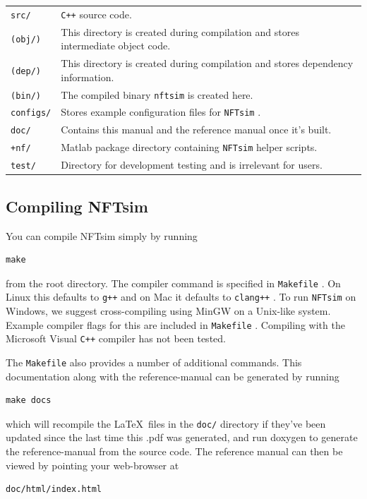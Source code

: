\documentclass[12pt,a4paper]{article}
\newcommand{\type}[1]{{\small\small\tt #1} }
\newcommand{\NF}[0]{\type{NFTsim}}
\begin{document}
\begin{tabular}{l p{13cm}}
\type{src/}& \type{C++} source code.\\
\type{(obj/)}& This directory is created during compilation and stores intermediate object code.\\
\type{(dep/)}& This directory is created during compilation and stores dependency information.\\
\type{(bin/)}& The compiled binary \type{nftsim} is created here.\\
\type{configs/}& Stores example configuration files for \NF.\\
\type{doc/}& Contains this manual and the reference manual once it's built.\\
\type{+nf/}& Matlab package directory containing \NF helper scripts.\\
\type{test/}& Directory for development testing and is irrelevant for users.\\
\end{tabular}

\subsection{Compiling NFTsim}
\label{sec:compiling}
You can compile NFTsim simply by running

\begin{lstlisting}
make
\end{lstlisting}

from the root directory. The compiler command is specified in \type{Makefile}. On Linux this defaults to \type{g++} and on Mac it defaults to \type{clang++}. To run \NF on Windows, we suggest cross-compiling using MinGW on a Unix-like system. Example compiler flags for this are included in \type{Makefile}. Compiling with the Microsoft Visual \type{C++} compiler has not been tested.

The \type{Makefile} also provides a number of additional commands. This documentation along with the reference-manual can be generated by running
\begin{lstlisting}
make docs
\end{lstlisting}
which will recompile the \LaTeX\ files in the \type{doc/} directory if they've been updated since the last time this .pdf was generated, and run doxygen to generate the reference-manual from the source code. The reference manual can then be viewed by pointing your web-browser at

\begin{lstlisting}
doc/html/index.html
\end{lstlisting}
\end{document}
